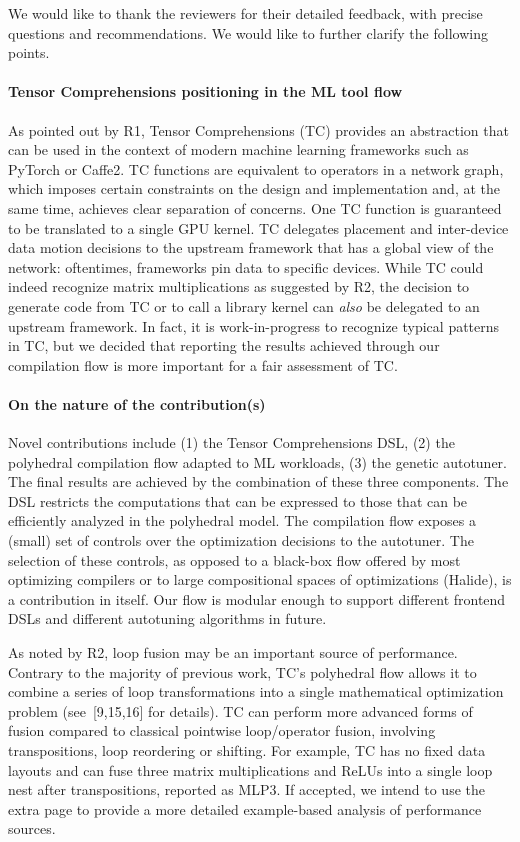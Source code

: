 \documentclass{article}
\begin{document}
\thispagestyle{empty}
We would like to thank the reviewers for their detailed feedback,
with precise questions and recommendations.
We would like to further clarify the following points.

\paragraph{Tensor Comprehensions positioning in the ML tool flow}
As pointed out by R1, Tensor Comprehensions (TC) provides an abstraction that
can be used in the context of modern machine learning frameworks such as
PyTorch or Caffe2.
TC functions are equivalent to operators in a network graph, which imposes
certain constraints on the design and implementation and,
at the same time, achieves clear separation of concerns.
One TC function is guaranteed to be translated to a single GPU kernel.
TC delegates placement and inter-device data motion decisions to the upstream
framework that has a global view of the network: oftentimes, frameworks pin
data to specific devices.
While TC could indeed recognize matrix multiplications as suggested by R2, the
decision to generate code from TC or to call a library kernel
can \emph{also} be delegated to an upstream framework.
In fact, it is work-in-progress to recognize typical patterns in TC, but
we decided that reporting the results achieved through our compilation flow
is more important for a fair assessment of TC.

\paragraph{On the nature of the contribution(s)}
Novel contributions include (1) the Tensor Comprehensions DSL,
(2) the polyhedral compilation flow adapted to ML workloads,
(3) the genetic autotuner.
The final results are achieved by the combination of these three components.
The DSL restricts the computations that can be expressed to those that can be
efficiently analyzed in the polyhedral model.
The compilation flow exposes a (small) set of controls over the optimization
decisions to the autotuner.
The selection of these controls, as opposed to a black-box flow
offered by most optimizing compilers or to large compositional spaces of
optimizations (Halide), is a contribution in itself.
Our flow is modular enough to support different frontend DSLs and
different autotuning algorithms in future.

As noted by R2, loop fusion may be an important source of performance.
Contrary to the majority of previous work, TC's polyhedral flow
allows it to combine a series of loop transformations into a single
mathematical optimization problem (see~[9,15,16] for details).
TC can perform more advanced forms of fusion compared to classical pointwise
loop/operator fusion, involving transpositions, loop reordering or shifting.
For example, TC has no fixed data layouts and can fuse three matrix
multiplications and ReLUs into a single loop nest after
transpositions, reported as MLP3.  If accepted, we intend to use the
extra page to provide a more detailed example-based analysis of performance
sources.
\end{document}
